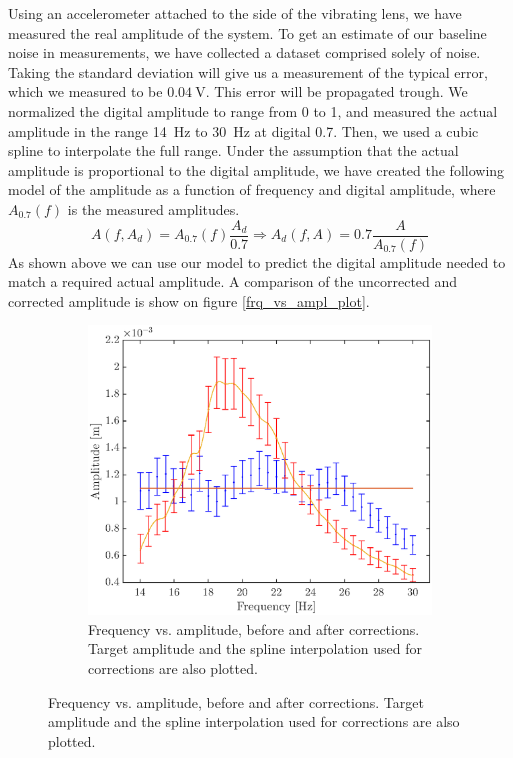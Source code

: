 \documentclass[12pt,oneside,a4paper]{article}
\numberwithin{equation}{section}
\begin{document}
{{{{Using an accelerometer attached to the side of the vibrating lens, we have 
measured the real amplitude of the system. To get an estimate of our baseline 
noise in measurements, we have collected a dataset comprised solely of noise. 
Taking the standard deviation will give us a measurement of the typical error, 
which we measured to be $\SI{0.04}{\volt}$. This error will be propagated 
trough. We normalized the digital amplitude to range from 0 to 1, and measured 
the actual amplitude in the range \SI{14}{Hz} to \SI{30}{Hz} at digital 0.7. 
Then, we used a cubic spline to interpolate the full range. Under the 
assumption that the actual amplitude is proportional to the digital amplitude, 
we have created the following model of the amplitude as a function of frequency 
and digital amplitude, where $A_{0.7}(f)$ is the measured amplitudes.
\begin{equation}
	A(f,A_{d}) = A_{0.7}(f)\frac{A_{d}}{0.7} \Rightarrow A_d(f,A) = 0.7\frac{A}{A_{0.7}(f)}
	\label{ampl_model}
\end{equation}
As shown above we can use our model to predict the digital amplitude needed to match a required actual amplitude. A comparison of the uncorrected and corrected amplitude is show on figure \ref{frq_vs_ampl_plot}.
\begin{figure}[h]
	\centering
	\begin{subfigure}[t]{0.49\textwidth}
		\centering
		\includegraphics[width=\textwidth]{amplcorr2.eps} 
		\caption{Frequency vs. amplitude, before and after corrections. Target amplitude and the spline interpolation used for corrections are also plotted.}

\end{subfigure}
\end{figure}}}}}
\end{document}
